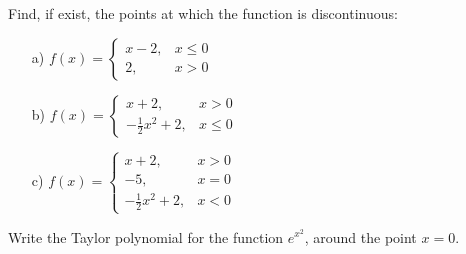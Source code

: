 \begin{problem}
    Find, if exist, the points at which the function is discontinuous:

    \begin{enumerate}
     \item[a) ] $f(x) = \begin{cases} x - 2, &  x \leq 0 \\ 2, &  x > 0 \end{cases}$
\\
     \smallskip
     
     \smallskip
        
     \item[b) ] $f(x) = \begin{cases} x + 2, &  x > 0  \\ -\frac{1}{2}x^{2}+2, &  x \le 0 \end{cases}$
  \\
  \smallskip
     
     \smallskip
        
        
        \item[c) ] $f(x) = \begin{cases} x + 2, &  x > 0 \\ -5, &  x = 0 \\ -\frac{1}{2}x^{2}+2, &  x < 0 \end{cases}$
  \\
  \smallskip
     
        
        
        
        
    \end{enumerate}
\end{problem}
\bigskip
\begin{problem}
    Write the Taylor polynomial for the function $e^{x^2}$, around the point $x=0$.
\end{problem}

